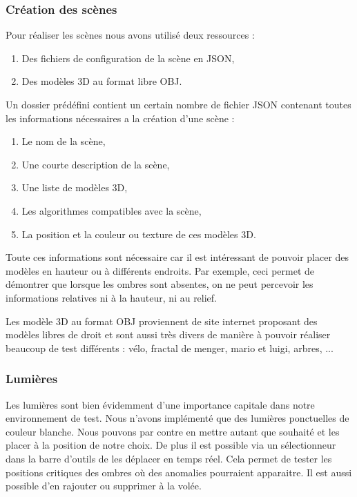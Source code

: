 \documentclass[a4paper,12pt]{report}
\begin{document}
\subsubsection{Création des scènes}

Pour réaliser les scènes nous avons utilisé deux ressources :

\begin{enumerate}
  \item Des fichiers de configuration de la scène en JSON,
  \item Des modèles 3D au format libre OBJ.
\end{enumerate}

Un dossier prédéfini contient un certain nombre de fichier JSON contenant toutes les informations nécessaires a la création d'une scène :

\begin{enumerate}
  \item Le nom de la scène,
  \item Une courte description de la scène,
  \item Une liste de modèles 3D,
  \item Les algorithmes compatibles avec la scène,
  \item La position et la couleur ou texture de ces modèles 3D.
\end{enumerate}

Toute ces informations sont nécessaire car il est intéressant de pouvoir placer des modèles en hauteur ou à différents endroits. Par exemple, ceci permet de démontrer que lorsque les ombres sont absentes, on ne peut percevoir les informations relatives ni à la hauteur, ni au relief.

Les modèle 3D au format OBJ proviennent de site internet proposant des modèles libres de droit et sont aussi très divers de manière à pouvoir réaliser beaucoup de test différents : vélo, fractal de menger, mario et luigi, arbres, ...

\subsubsection{Lumières}

Les lumières sont bien évidemment d'une importance capitale dans notre environnement de test. Nous n'avons implémenté que des lumières ponctuelles de couleur blanche. Nous pouvons par contre en mettre autant que souhaité et les placer à la position de notre choix. De plus il est possible via un sélectionneur dans la barre d'outils de les déplacer en temps réel. Cela permet de tester les positions critiques des ombres où des anomalies pourraient apparaitre.
Il est aussi possible d'en rajouter ou supprimer à la volée.
\end{document}
